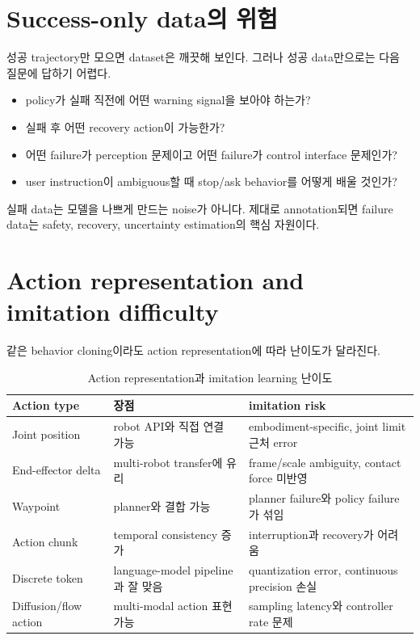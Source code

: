 \section{Success-only data의 위험}

성공 trajectory만 모으면 dataset은 깨끗해 보인다. 그러나 성공 data만으로는 다음 질문에 답하기 어렵다.

\begin{itemize}
  \item policy가 실패 직전에 어떤 warning signal을 보아야 하는가?
  \item 실패 후 어떤 recovery action이 가능한가?
  \item 어떤 failure가 perception 문제이고 어떤 failure가 control interface 문제인가?
  \item user instruction이 ambiguous할 때 stop/ask behavior를 어떻게 배울 것인가?
\end{itemize}

실패 data는 모델을 나쁘게 만드는 noise가 아니다. 제대로 annotation되면 failure data는 safety, recovery, uncertainty estimation의 핵심 자원이다.

\section{Action representation and imitation difficulty}

같은 behavior cloning이라도 action representation에 따라 난이도가 달라진다.

\begin{table}[ht]
\centering
\caption{Action representation과 imitation learning 난이도}
\label{tab:action-bc-difficulty}
\small
\begin{tabularx}{\textwidth}{p{28mm}X X}
\toprule
Action type & 장점 & imitation risk \\
\midrule
Joint position & robot API와 직접 연결 가능 & embodiment-specific, joint limit 근처 error \\
End-effector delta & multi-robot transfer에 유리 & frame/scale ambiguity, contact force 미반영 \\
Waypoint & planner와 결합 가능 & planner failure와 policy failure가 섞임 \\
Action chunk & temporal consistency 증가 & interruption과 recovery가 어려움 \\
Discrete token & language-model pipeline과 잘 맞음 & quantization error, continuous precision 손실 \\
Diffusion/flow action & multi-modal action 표현 가능 & sampling latency와 controller rate 문제 \\
\bottomrule
\end{tabularx}
\end{table}

